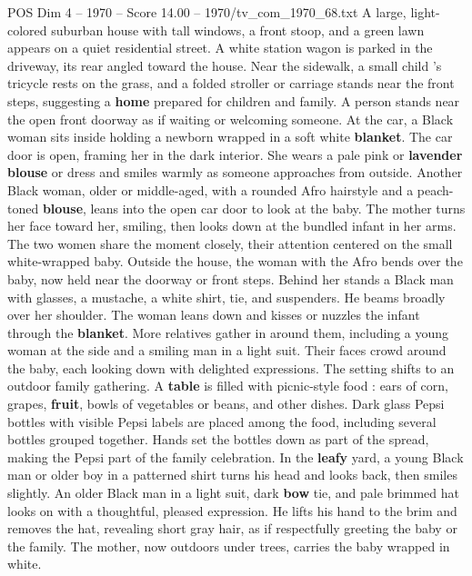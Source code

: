\begin{textsample}{POS Dim 4 – 1970 – Score 14.00 – 1970/tv\_com\_1970\_68.txt}  \label{ex:f4_pos_085}
A large, light-colored suburban house with tall windows, a front stoop, and a green lawn appears on a quiet residential street.
A white station wagon is parked in the driveway, its rear angled toward the house.
Near the sidewalk, a small child ’s tricycle rests on the grass, and a folded stroller or carriage stands near the front steps, suggesting a \textbf{home} prepared for children and family.
A person stands near the open front doorway as if waiting or welcoming someone.
At the car, a Black woman sits inside holding a newborn wrapped in a soft white \textbf{blanket}.
The car door is open, framing her in the dark interior.
She wears a pale pink or \textbf{lavender} \textbf{blouse} or dress and smiles warmly as someone approaches from outside.
Another Black woman, older or middle-aged, with a rounded Afro hairstyle and a peach-toned \textbf{blouse}, leans into the open car door to look at the baby.
The mother turns her face toward her, smiling, then looks down at the bundled infant in her arms.
The two women share the moment closely, their attention centered on the small white-wrapped baby.
Outside the house, the woman with the Afro bends over the baby, now held near the doorway or front steps.
Behind her stands a Black man with glasses, a mustache, a white shirt, tie, and suspenders.
He beams broadly over her shoulder.
The woman leans down and kisses or nuzzles the infant through the \textbf{blanket}.
More relatives gather in around them, including a young woman at the side and a smiling man in a light suit.
Their faces crowd around the baby, each looking down with delighted expressions.
The setting shifts to an outdoor family gathering.
A \textbf{table} is filled with picnic-style food : ears of corn, grapes, \textbf{fruit}, bowls of vegetables or beans, and other dishes.
Dark glass Pepsi bottles with visible Pepsi labels are placed among the food, including several bottles grouped together.
Hands set the bottles down as part of the spread, making the Pepsi part of the family celebration.
In the \textbf{leafy} yard, a young Black man or older boy in a patterned shirt turns his head and looks back, then smiles slightly.
An older Black man in a light suit, dark \textbf{bow} tie, and pale brimmed hat looks on with a thoughtful, pleased expression.
He lifts his hand to the brim and removes the hat, revealing short gray hair, as if respectfully greeting the baby or the family.
The mother, now outdoors under trees, carries the baby wrapped in white.

\end{textsample}
